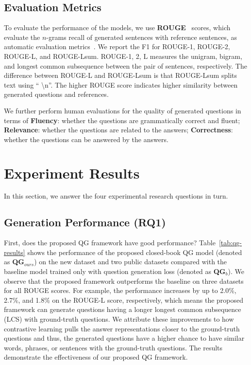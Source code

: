 \documentclass[11pt]{article}
\begin{document}
\subsection{Evaluation Metrics}
To evaluate the performance of the models, we use \textbf{ROUGE}~\cite{lin-2004-rouge} scores, which evaluate the $n$-grams recall of generated sentences with reference sentences, as automatic evaluation metrics~\cite{fan-etal-2019-eli5,khashabi-etal-2021-gooaq-open}. We report the F1 for ROUGE-1, ROUGE-2, ROUGE-L, and ROUGE-Lsum. ROUGE-1, 2, L measures the unigram, bigram, and longest common subsequence between the pair of sentences, respectively. The difference between ROUGE-L and ROUGE-Lsum is that ROUGE-Lsum splits text using `` \textbackslash n''. The higher ROUGE score indicates higher similarity between generated questions and references. 

We further perform human evaluations for the quality of generated questions in terms of \textbf{Fluency}: whether the questions are grammatically correct and fluent; \textbf{Relevance}: whether the questions are related to the answers; \textbf{Correctness}: whether the questions can be answered by the answers.

\section{Experiment Results}
In this section, we answer the four experimental research questions in turn.
\subsection{Generation Performance (RQ1)}
First, does the proposed QG framework have good performance? Table~\ref{tab:qg-results} shows the performance of the proposed closed-book QG model (denoted as \textbf{QG}$_{ours}$) on the new dataset and two public datasets compared with the baseline model trained only with question generation loss (denoted as \textbf{QG}$_{b}$). 
We observe that the proposed framework outperforms the baseline on three datasets for all ROUGE scores. For example, the performance increases by up to 2.0\%, 2.7\%, and 1.8\% on the ROUGE-L score, respectively, which means the proposed framework can generate questions having a longer longest common subsequence (LCS) with ground-truth questions. We attribute these improvements to how contrastive learning pulls the answer representations closer to the ground-truth questions and thus, the generated questions have a higher chance to have similar words, phrases, or sentences with the ground-truth questions. The results demonstrate the effectiveness of our proposed QG framework.
\end{document}
